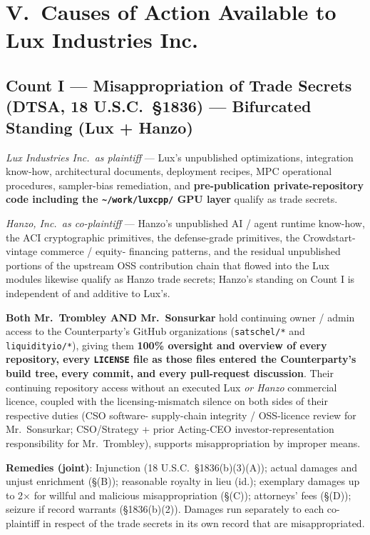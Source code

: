 \documentclass[11pt,letterpaper]{article}
\begin{document}
\section*{V.\ Causes of Action Available to Lux Industries Inc.}

\subsection*{Count I --- Misappropriation of Trade Secrets (DTSA, 18 U.S.C.\ \S 1836) --- Bifurcated Standing (Lux + Hanzo)}

\textit{Lux Industries Inc.\ as plaintiff} --- Lux's unpublished
optimizations, integration know-how, architectural documents,
deployment recipes, MPC operational procedures, sampler-bias
remediation, and \textbf{pre-publication private-repository code
including the \texttt{\textasciitilde/work/luxcpp/} GPU layer}
qualify as trade secrets.

\textit{Hanzo, Inc.\ as co-plaintiff} --- Hanzo's unpublished AI /
agent runtime know-how, the ACI cryptographic primitives, the
defense-grade primitives, the Crowdstart-vintage commerce / equity-
financing patterns, and the residual unpublished portions of the
upstream OSS contribution chain that flowed into the Lux modules
likewise qualify as Hanzo trade secrets; Hanzo's standing on
Count I is independent of and additive to Lux's.

\textbf{Both Mr.\ Trombley AND Mr.\ Sonsurkar} hold continuing
owner / admin access to the Counterparty's GitHub organizations
(\texttt{satschel/*} and \texttt{liquidityio/*}), giving them
\textbf{100\% oversight and overview of every repository, every
\texttt{LICENSE} file as those files entered the Counterparty's
build tree, every commit, and every pull-request discussion}.
Their continuing repository access without an executed Lux \emph{or
Hanzo} commercial licence, coupled with the licensing-mismatch
silence on both sides of their respective duties (CSO software-
supply-chain integrity / OSS-licence review for Mr.\ Sonsurkar;
CSO/Strategy + prior Acting-CEO investor-representation
responsibility for Mr.\ Trombley), supports misappropriation by
improper means.

\textbf{Remedies (joint)}: Injunction (18 U.S.C.\ \S 1836(b)(3)(A));
actual damages and unjust enrichment (\S (B)); reasonable royalty
in lieu (id.); exemplary damages up to 2$\times$ for willful and
malicious misappropriation (\S (C)); attorneys' fees (\S (D));
seizure if record warrants (\S 1836(b)(2)). Damages run separately
to each co-plaintiff in respect of the trade secrets in its own
record that are misappropriated.
\end{document}
